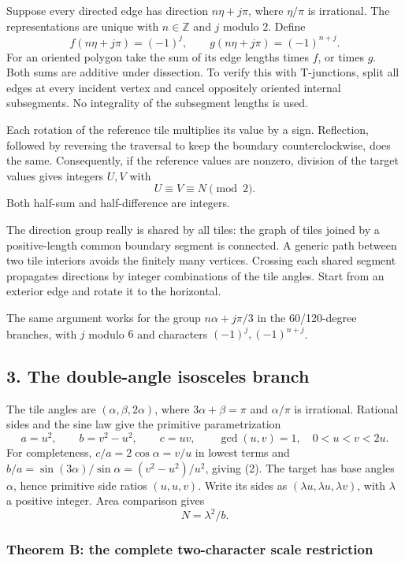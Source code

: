 \documentclass[
  11pt,
]{article}
\begin{document}
Suppose every directed edge has direction \(n\eta+j\pi\), where
\(\eta/\pi\) is irrational. The representations are unique with
\(n\in\mathbb Z\) and \(j\) modulo \(2\). Define
\[f(n\eta+j\pi)=(-1)^j,\qquad g(n\eta+j\pi)=(-1)^{n+j}.\] For an
oriented polygon take the sum of its edge lengths times \(f\), or times
\(g\). Both sums are additive under dissection. To verify this with
T-junctions, split all edges at every incident vertex and cancel
oppositely oriented internal subsegments. No integrality of the
subsegment lengths is used.

Each rotation of the reference tile multiplies its value by a sign.
Reflection, followed by reversing the traversal to keep the boundary
counterclockwise, does the same. Consequently, if the reference values
are nonzero, division of the target values gives integers \(U,V\) with
\[U\equiv V\equiv N\pmod2.\tag{1}\] Both half-sum and half-difference
are integers.

The direction group really is shared by all tiles: the graph of tiles
joined by a positive-length common boundary segment is connected. A
generic path between two tile interiors avoids the finitely many
vertices. Crossing each shared segment propagates directions by integer
combinations of the tile angles. Start from an exterior edge and rotate
it to the horizontal.

The same argument works for the group \(n\alpha+j\pi/3\) in the
60/120-degree branches, with \(j\) modulo \(6\) and characters
\((-1)^j,(-1)^{n+j}\).

\subsection{3. The double-angle isosceles
branch}\label{the-double-angle-isosceles-branch}

The tile angles are \((\alpha,\beta,2\alpha)\), where
\(3\alpha+\beta=\pi\) and \(\alpha/\pi\) is irrational. Rational sides
and the sine law give the primitive parametrization
\[a=u^2,\qquad b=v^2-u^2,\qquad c=uv,
\qquad \gcd(u,v)=1,\quad 0<u<v<2u.\tag{2}\] For completeness,
\(c/a=2\cos\alpha=v/u\) in lowest terms and
\(b/a=\sin(3\alpha)/\sin\alpha=(v^2-u^2)/u^2\), giving (2). The target
has base angles \(\alpha\), hence primitive side ratios \((u,u,v)\).
Write its sides as \((\lambda u,\lambda u,\lambda v)\), with \(\lambda\)
a positive integer. Area comparison gives \[N=\lambda^2/b.\tag{3}\]

\subsubsection{Theorem B: the complete two-character scale
restriction}\label{theorem-b-the-complete-two-character-scale-restriction}
\end{document}
